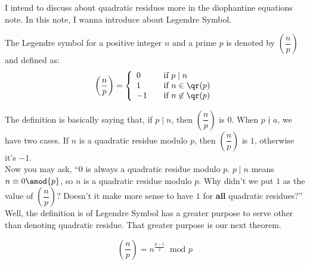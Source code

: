 \documentclass[11pt]{scrartcl}
\begin{document}
I intend to discuss about quadratic residues more in the diophantine equations note. In this note, I wanna introduce about Legendre Symbol.
\begin{defn}
The Legendre symbol for a positive integer \(n\) and a prime \(p\) is denoted by \(\left(\dfrac{n}{p}\right) \) and defined as:
\[
\left(\dfrac{n}{p}\right) = \left\{ \begin{array}{ll}
0 & \quad \text{if } p \mid n \\
1 & \quad \text{if } n \in \qr(p) \\
-1 & \quad \text{if } n \not\in \qr(p)
\end{array}\right.
\]
\end{defn}
The definition is basically saying that, if \(p \mid n\), then \(\left(\dfrac{n}{p}\right)\) is \(0\). When \(p\nmid a\), we have two cases. If \(n\) is a quadratic residue modulo \(p\), then \(\left(\dfrac{n}{p}\right)\) is \(1\), otherwise it's \(-1\). \\
Now you may ask, ``\(0\) is always a quadratic residue modulo \(p\). \(p \mid n\) means \(n \equiv 0 \amod{p}\), so \(n\) is a quadratic residue modulo \(p\). Why didn't we put \(1\) as the value of \(\left(\dfrac{n}{p}\right)\)? Doesn't it make more sense to have \(1\) for \textbf{all} quadratic residues?'' Well, the definition is of Legendre Symbol has a greater purpose to serve other than denoting quadratic residue. That greater purpose is our next theorem.
\begin{theorem}
\[ \left(\dfrac{n}{p}\right) = n^{\frac{p-1}{2}} \ \text{ mod } p\]
\end{theorem}
\end{document}
